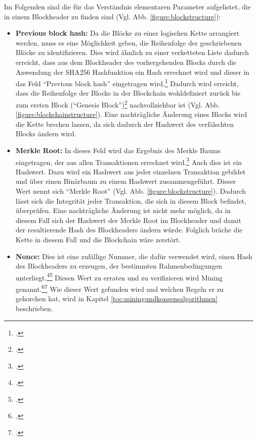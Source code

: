 Im Folgenden sind die für das Verständnis elementaren Parameter aufgelistet, die in einem Blockheader zu finden
sind (Vgl. Abb. \ref{figure:blockstructure}):
\begin{itemize}
    \item \textbf{Previous block hash: }Da die Blöcke zu einer logischen Kette arrangiert werden, muss es eine
    Möglichkeit geben, die Reihenfolge der geschriebenen Blöcke zu identifizieren. Dies wird ähnlich zu einer
    verketteten Liste dadurch erreicht, dass aus dem Blockheader des vorhergehenden Blocks durch die Anwendung der \ac{SHA}256
    Hashfunktion ein Hash errechnet wird und dieser in das Feld "`Previous block hash"' eingetragen
    wird.\footcite[Vgl.][S. 4]{nakamoto2008bitcoin} Dadurch wird erreicht,
    dass die Reihenfolge der Blocks in der Blockchain wohldefiniert zurück bis zum ersten Block
    ("`Genesis Block"')\footcite[Vgl.][Abb. 3.2]{bhaskar2015bitcoin} nachvollziehbar ist (Vgl. Abb. \ref{figure:blockchainstructure}).
    Eine nachträgliche     Änderung eines Blocks wird die Kette brechen lassen, da sich dadurch der Hashwert des
    verfälschten Blocks ändern wird.
    \item \textbf{Merkle Root: }In dieses Feld wird das Ergebnis des Merkle Baums eingetragen, der aus allen Transaktionen
    errechnet wird.\footcite[Vgl.][S. 4]{nakamoto2008bitcoin} Auch dies ist ein Hashwert. Dazu wird ein Hashwert aus
    jeder einzelnen Transaktion gebildet und über einen Binärbaum zu einem Hashwert zusammengeführt. Dieser Wert nennt
    sich "`Merkle Root"' (Vgl. Abb. \ref{figure:blockstructure}). Dadurch lässt sich die Integrität jeder Transaktion,
    die sich in diesem Block befindet, überprüfen. Eine nachträgliche Änderung ist nicht mehr möglich, da in diesem
    Fall sich der Hashwert der Merkle Root im Blockheader und damit der resultierende Hash des Blockheaders ändern würde.
    Folglich bräche die Kette in diesem Fall und die Blockchain wäre zerstört.
    \item \textbf{Nonce: }Dies ist eine zufällige Nummer, die dafür verwendet wird, einen Hash des Blockheaders zu erzeugen,
    der bestimmten Rahmenbedingungen unterliegt.\footcite[Vgl.][S. 745]{mukhopadhyay2016brief}\footcite[Vgl.][S. 136]{courtois2014optimizing}
    Diesen Wert zu erraten und zu verifizieren wird Mining genannt.\footcite[Vgl.][S. 50f]{bhaskar2015bitcoin}\footcite[Vgl.][S. 24]{han2019demystifying}
    Wie dieser Wert gefunden wird und welchen Regeln er zu gehorchen hat, wird in Kapitel \ref{toc:miningundkonsensalgorithmen}
    beschrieben.
\end{itemize}


